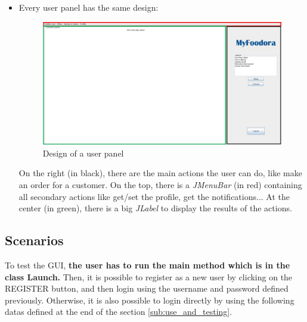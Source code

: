 \begin{itemize}
	\item Every user panel has the same design:
\begin{figure}[H]
	\centering
	\includegraphics[width=0.8\linewidth]{./ima/designUserPanel.jpg}
	\caption{Design of a user panel}
	\label{design_of_user_panel}
\end{figure}
On the right (in black), there are the main actions the user can do, like make an order for a customer. On the top, there is a \textit{JMenuBar} (in red) containing all secondary actions like get/set the profile, get the notifications... At the center (in green), there is a big \textit{JLabel} to display the results of the actions.


\end{itemize}

\subsection{Scenarios}
To test the GUI, \textbf{the user has to run the main method which is in the class Launch.} Then, it is possible to register as a new user by clicking on the REGISTER button, and then login using the username and password defined previously. Otherwise, it is also possible to login directly by using the following datas defined at the end of the section \ref{sub:use_and_testing}.
\label{sub:scenarios}
